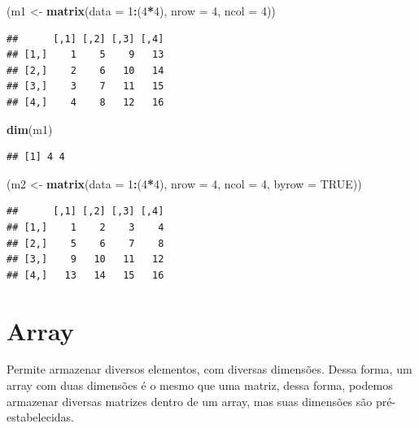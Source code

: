 \documentclass[]{book}
\newenvironment{Shaded}{\begin{snugshade}}{\end{snugshade}}
\newcommand{\KeywordTok}[1]{\textcolor[rgb]{0.13,0.29,0.53}{\textbf{#1}}}
\newcommand{\DataTypeTok}[1]{\textcolor[rgb]{0.13,0.29,0.53}{#1}}
\newcommand{\DecValTok}[1]{\textcolor[rgb]{0.00,0.00,0.81}{#1}}
\newcommand{\StringTok}[1]{\textcolor[rgb]{0.31,0.60,0.02}{#1}}
\newcommand{\OtherTok}[1]{\textcolor[rgb]{0.56,0.35,0.01}{#1}}
\newcommand{\OperatorTok}[1]{\textcolor[rgb]{0.81,0.36,0.00}{\textbf{#1}}}
\newcommand{\NormalTok}[1]{#1}
\theoremstyle{definition}
\theoremstyle{definition}
\theoremstyle{definition}
\theoremstyle{remark}
\begin{document}
\begin{Shaded}
\begin{Highlighting}[]
\NormalTok{(m1 <-}\StringTok{ }\KeywordTok{matrix}\NormalTok{(}\DataTypeTok{data =} \DecValTok{1}\OperatorTok{:}\NormalTok{(}\DecValTok{4}\OperatorTok{*}\DecValTok{4}\NormalTok{), }\DataTypeTok{nrow =} \DecValTok{4}\NormalTok{, }\DataTypeTok{ncol =} \DecValTok{4}\NormalTok{))}
\end{Highlighting}
\end{Shaded}

\begin{verbatim}
##      [,1] [,2] [,3] [,4]
## [1,]    1    5    9   13
## [2,]    2    6   10   14
## [3,]    3    7   11   15
## [4,]    4    8   12   16
\end{verbatim}

\begin{Shaded}
\begin{Highlighting}[]
\KeywordTok{dim}\NormalTok{(m1)}
\end{Highlighting}
\end{Shaded}

\begin{verbatim}
## [1] 4 4
\end{verbatim}

\begin{Shaded}
\begin{Highlighting}[]
\NormalTok{(m2 <-}\StringTok{ }\KeywordTok{matrix}\NormalTok{(}\DataTypeTok{data =} \DecValTok{1}\OperatorTok{:}\NormalTok{(}\DecValTok{4}\OperatorTok{*}\DecValTok{4}\NormalTok{), }\DataTypeTok{nrow =} \DecValTok{4}\NormalTok{, }\DataTypeTok{ncol =} \DecValTok{4}\NormalTok{, }\DataTypeTok{byrow =} \OtherTok{TRUE}\NormalTok{))}
\end{Highlighting}
\end{Shaded}

\begin{verbatim}
##      [,1] [,2] [,3] [,4]
## [1,]    1    2    3    4
## [2,]    5    6    7    8
## [3,]    9   10   11   12
## [4,]   13   14   15   16
\end{verbatim}

\section{Array}\label{array}

Permite armazenar diversos elementos, com diversas dimensões. Dessa
forma, um array com duas dimensões é o mesmo que uma matriz, dessa
forma, podemos armazenar diversas matrizes dentro de um array, mas suas
dimensões são pré-estabelecidas.
\end{document}
